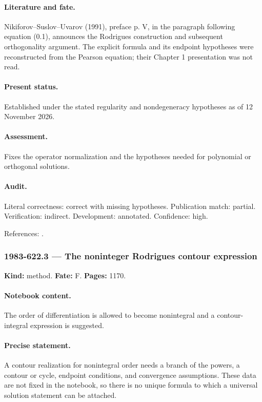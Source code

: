 \paragraph{Literature and fate.} Nikiforov–Suslov–Uvarov (1991), preface p. V, in the paragraph following equation (0.1), announces the Rodrigues construction and subsequent orthogonality argument. The explicit formula and its endpoint hypotheses were reconstructed from the Pearson equation; their Chapter 1 presentation was not read.

\paragraph{Present status.} Established under the stated regularity and nondegeneracy hypotheses as of 12 November 2026.

\paragraph{Assessment.} Fixes the operator normalization and the hypotheses needed for polynomial or orthogonal solutions.

\paragraph{Audit.} Literal correctness: correct with missing hypotheses. Publication match: partial. Verification: indirect. Development: annotated. Confidence: high.

\noindent References: \citep{nikiforovsuslovuvarov1991classical}.\par

\subsubsection{1983-622.3 --- The noninteger Rodrigues contour expression}

\label{item:1983-622.3}

\noindent\textbf{Kind:} method. \textbf{Fate:} F. \textbf{Pages:} 1170.\par

\paragraph{Notebook content.} The order of differentiation is allowed to become nonintegral and a contour-integral expression is suggested.

\paragraph{Precise statement.} A contour realization for nonintegral order needs a branch of the powers, a contour or cycle, endpoint conditions, and convergence assumptions. These data are not fixed in the notebook, so there is no unique formula to which a universal solution statement can be attached.

